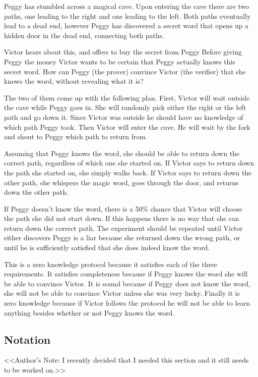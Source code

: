 \documentclass{sig-alternate}
\begin{document}
	Peggy has stumbled across a magical cave. Upon entering the cave
	there are two paths, one leading to the right and one leading to the
	left. Both paths eventually lead to a dead end, however Peggy has
	discovered a secret word that opens up a hidden door in the dead end,
	connecting both paths.

	Victor hears about this, and offers to buy the secret from Peggy
	Before giving Peggy the money Victor
	wants to be certain that Peggy actually knows this secret word. How can
	Peggy (the prover) convince Victor (the verifier) that she knows the
	word, without revealing what it is?

	The two of them come up with the following plan. First, Victor will wait
	outside the cave while Peggy goes in. She will randomly pick either the
	right or the left path and go down it. Since Victor was outside he
	should have no knowledge of which path Peggy took. Then Victor will
	enter the cave. He will wait by the fork and shout to Peggy which
	path to return from. 
	
	Assuming that Peggy knows the word, she should be able to return down
	the correct path, regardless of which one she started on. If Victor 
	says to	return down the path she started on, she simply walks back. 
	If Victor says to return down the other path, she whispers the magic
	word, goes through the door, and returns down the other path.

	If Peggy doesn't know the word, there is a 50\% chance that Victor
	will choose the path she did not start down. If this happens there is
	no way that she can return down the correct path. The experiment should
	be repeated until Victor either discovers Peggy is a liar because she
	returned down the wrong path, or until he is sufficiently satisfied
	that she does indeed know the word.

	This is a zero knowledge protocol because it satisfies each of the three
	requirements. It satisfies completeness because	if Peggy knows the word
	she will be able to convince Victor. It is sound because if Peggy does not 
	know the word, she will not be able to convince Victor unless she was very
	lucky. Finally it is zero knowledge because if Victor follows the protocol
	he will not be able to learn anything besides whether or not Peggy knows 
	the word.
	
	\subsection{Notation}
	<<Author's Note: I recently decided that I needed this section and it still
	needs to be worked on.>>
\end{document}
